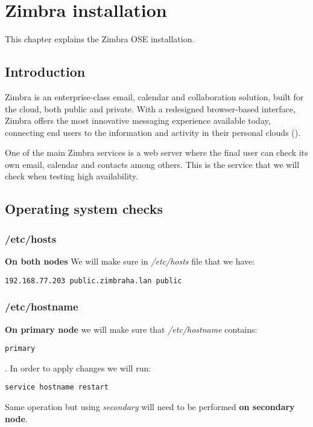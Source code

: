 

\chapter{Zimbra installation}
\label{chap:zimbra-installation}
This chapter explains the Zimbra OSE installation.

\section {Introduction}
Zimbra is an enterprise-class email, calendar and collaboration solution, built for the cloud, both public and private. With a redesigned browser-based interface, Zimbra offers the most innovative messaging experience available today, connecting end users to the information and activity in their personal clouds (\cite{ZimbraWeb}).

One of the main Zimbra services is a web server where the final user can check its own email, calendar and contacts among others. This is the service that we will check when testing high availability.

\section {Operating system checks}
\subsection {/etc/hosts}
\textbf{On both nodes}
We will make sure in \textit{/etc/hosts} file that we have:

\begin{verbatim}
192.168.77.203 public.zimbraha.lan public
\end{verbatim}
\subsection {/etc/hostname}
\textbf{On primary node} we will make sure that \textit{/etc/hostname} contains:

\begin{verbatim}
primary
\end{verbatim}
. In order to apply changes we will run:
\begin{verbatim}
service hostname restart
\end{verbatim}

Same operation but using \textit{secondary} will need to be performed \textbf{on secondary node}.

